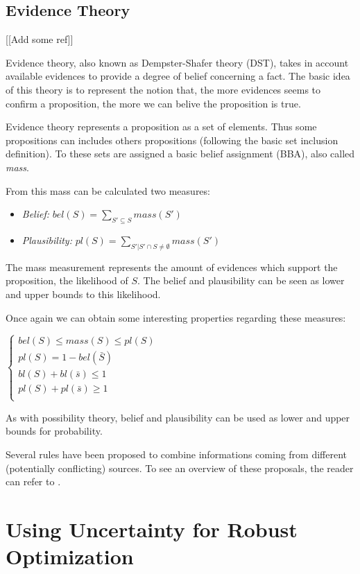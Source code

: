 \subsection{Evidence Theory}

[[Add some ref]]

Evidence theory, also known as Dempster-Shafer theory (DST), takes in account available evidences to provide a degree of belief concerning a fact.
The basic idea of this theory is to represent the notion that, the more evidences seems to confirm a proposition, the more we can belive the proposition is true.

Evidence theory represents a proposition as a set of elements. Thus some propositions can includes others propositions (following the basic set inclusion definition). To these sets are assigned a basic belief assignment (BBA), also called \emph{mass}.

From this mass can be calculated two measures:

\begin{itemize}
\item \emph{Belief:} $bel(S) = \sum_{S'\subseteq{S}} mass(S')$
\item \emph{Plausibility:} $pl(S) = \sum_{S'|S' \cap S \neq \emptyset} mass(S')$
\end{itemize}

The mass measurement represents the amount of evidences which support the proposition, the likelihood of $S$. The belief and plausibility can be seen as lower and upper bounds to this likelihood.

Once again we can obtain some interesting properties regarding these measures:

$\left\{
\begin{array}{l}
bel(S) \leq mass(S) \leq pl(S)\\
pl(S) = 1 - bel(\bar{S})\\
bl(S) + bl(\bar{s}) \leq 1\\
pl(S) + pl(\bar{s}) \geq 1\\
\end{array}
\right.$

As with possibility theory, belief and plausibility can be used as lower and upper bounds for probability.

Several rules have been proposed to combine informations coming from different (potentially conflicting) sources. To see an overview of these proposals, the reader can refer to \cite{sentz2002combination}.

\section{Using Uncertainty for Robust Optimization}


